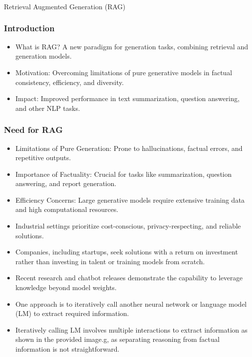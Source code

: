 \begin{frame}[fragile]\frametitle{}
\begin{center}
{\Large Retrieval Augmented Generation (RAG)}
\end{center}
\end{frame}

\begin{frame}[fragile]\frametitle{Introduction}

\begin{itemize}
\item What is RAG? A new paradigm for generation tasks, combining retrieval and generation models.
\item Motivation: Overcoming limitations of pure generative models in factual consistency, efficiency, and diversity.
\item Impact: Improved performance in text summarization, question answering, and other NLP tasks.
\end{itemize}	

\end{frame}


\begin{frame}[fragile]\frametitle{Need for RAG}

\begin{itemize}
\item Limitations of Pure Generation: Prone to hallucinations, factual errors, and repetitive outputs.
\item Importance of Factuality: Crucial for tasks like summarization, question answering, and report generation.
\item Efficiency Concerns: Large generative models require extensive training data and high computational resources.
\item Industrial settings prioritize cost-conscious, privacy-respecting, and reliable solutions.
\item Companies, including startups, seek solutions with a return on investment rather than investing in talent or training models from scratch.
\item Recent research and chatbot releases demonstrate the capability to leverage knowledge beyond model weights.
\item One approach is to iteratively call another neural network or language model (LM) to extract required information.
\item Iteratively calling LM involves multiple interactions to extract information as shown in the provided image.g, as separating reasoning from factual information is not straightforward.
\end{itemize}	

\end{frame}


